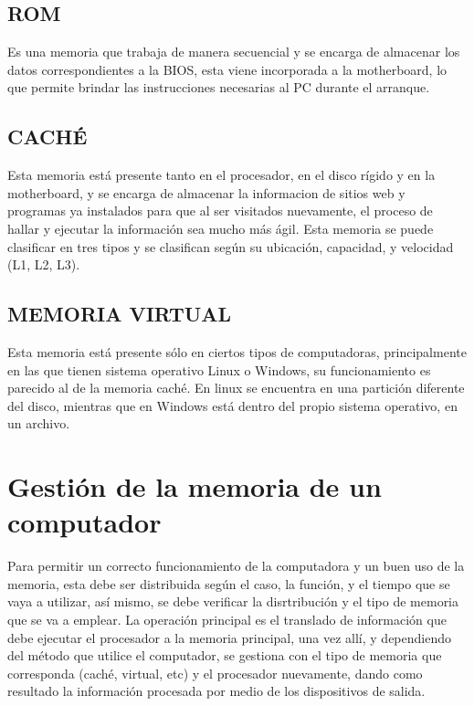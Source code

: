 ﻿\documentclass{article}
\begin{document}
\subsection{ROM}
Es una memoria que trabaja de manera secuencial y se encarga de almacenar los datos correspondientes a la BIOS, esta viene incorporada a la motherboard, lo que permite brindar las instrucciones necesarias al PC durante el arranque.

\subsection{CACHÉ}
Esta memoria está presente tanto en el procesador, en el disco rígido y en la motherboard, y se encarga de almacenar la informacion de sitios web y programas ya instalados para que al ser visitados nuevamente, el proceso de hallar y ejecutar la información sea mucho más ágil. Esta memoria se puede clasificar en tres tipos y se clasifican según su ubicación, capacidad, y velocidad (L1, L2, L3).

\subsection{MEMORIA VIRTUAL}
Esta memoria está presente sólo en ciertos tipos de computadoras, principalmente en las que tienen sistema operativo Linux o Windows, su funcionamiento es parecido al de la memoria caché. En linux se encuentra en una partición diferente del disco, mientras que en Windows está dentro del propio sistema operativo, en un archivo.

\section{Gestión de la memoria de un computador} \label{contenido}
Para permitir un correcto funcionamiento de la computadora y un buen uso de la memoria, esta debe ser distribuida según el caso, la función, y el tiempo que se vaya a utilizar, así mismo, se debe verificar la disrtribución y el tipo de memoria que se va a emplear. La operación principal es el translado de información que debe ejecutar el procesador a la memoria principal, una vez allí, y dependiendo del método que utilice el computador, se gestiona con el tipo de memoria que corresponda (caché, virtual, etc) y el procesador nuevamente, dando como resultado la información procesada por medio de los dispositivos de salida.
\end{document}
